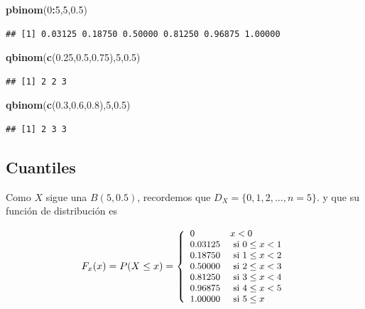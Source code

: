 \documentclass[]{book}
\newenvironment{Shaded}{\begin{snugshade}}{\end{snugshade}}
\newcommand{\DecValTok}[1]{\textcolor[rgb]{0.00,0.00,0.81}{#1}}
\newcommand{\FloatTok}[1]{\textcolor[rgb]{0.00,0.00,0.81}{#1}}
\newcommand{\KeywordTok}[1]{\textcolor[rgb]{0.13,0.29,0.53}{\textbf{#1}}}
\newcommand{\NormalTok}[1]{#1}
\newcommand{\OperatorTok}[1]{\textcolor[rgb]{0.81,0.36,0.00}{\textbf{#1}}}
\begin{document}
\begin{Shaded}
\begin{Highlighting}[]
\KeywordTok{pbinom}\NormalTok{(}\DecValTok{0}\OperatorTok{:}\DecValTok{5}\NormalTok{,}\DecValTok{5}\NormalTok{,}\FloatTok{0.5}\NormalTok{)}
\end{Highlighting}
\end{Shaded}

\begin{verbatim}
## [1] 0.03125 0.18750 0.50000 0.81250 0.96875 1.00000
\end{verbatim}

\begin{Shaded}
\begin{Highlighting}[]
\KeywordTok{qbinom}\NormalTok{(}\KeywordTok{c}\NormalTok{(}\FloatTok{0.25}\NormalTok{,}\FloatTok{0.5}\NormalTok{,}\FloatTok{0.75}\NormalTok{),}\DecValTok{5}\NormalTok{,}\FloatTok{0.5}\NormalTok{)}
\end{Highlighting}
\end{Shaded}

\begin{verbatim}
## [1] 2 2 3
\end{verbatim}

\begin{Shaded}
\begin{Highlighting}[]
\KeywordTok{qbinom}\NormalTok{(}\KeywordTok{c}\NormalTok{(}\FloatTok{0.3}\NormalTok{,}\FloatTok{0.6}\NormalTok{,}\FloatTok{0.8}\NormalTok{),}\DecValTok{5}\NormalTok{,}\FloatTok{0.5}\NormalTok{)}
\end{Highlighting}
\end{Shaded}

\begin{verbatim}
## [1] 2 3 3
\end{verbatim}

\hypertarget{cuantiles-2}{%
\subsection{Cuantiles}\label{cuantiles-2}}

Como \(X\) sigue una \(B(5,0.5)\), recordemos que \(D_X=\{0,1,2,\ldots,n=5\}.\) y que su función de distribución es

\[
\small{
F_x(x)=P(X\leq x)=
\left\{
\begin{array}{ll}
0 & x< 0 \\
0.03125 & \mbox{ si } 0 \leq x< 1 \\
0.18750 & \mbox{ si } 1 \leq x< 2 \\
0.50000 & \mbox{ si } 2 \leq x< 3 \\
0.81250 & \mbox{ si } 3 \leq x< 4 \\
0.96875 & \mbox{ si } 4 \leq x< 5 \\
1.00000 & \mbox{ si }  5\leq x \\
\end{array}
\right.}
\]
\end{document}
